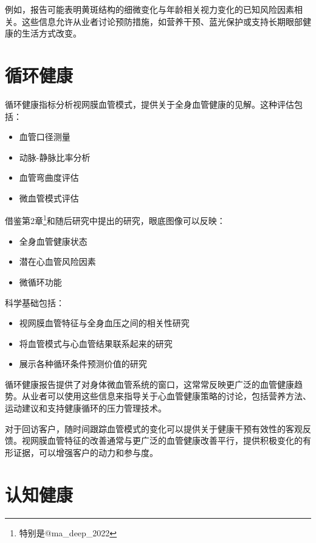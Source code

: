 \documentclass[
  Letterpaper,
]{scrbook}
\providecommand{\tightlist}{%
  \setlength{\itemsep}{0pt}\setlength{\parskip}{0pt}}\usepackage{longtable,booktabs,array}
\begin{document}
例如，报告可能表明黄斑结构的细微变化与年龄相关视力变化的已知风险因素相关。这些信息允许从业者讨论预防措施，如营养干预、蓝光保护或支持长期眼部健康的生活方式改变。

\section{循环健康}\label{ux5faaux73afux5065ux5eb7}

循环健康指标分析视网膜血管模式，提供关于全身血管健康的见解。这种评估包括：

\begin{itemize}
\tightlist
\item
  血管口径测量
\item
  动脉-静脉比率分析
\item
  血管弯曲度评估
\item
  微血管模式评估
\end{itemize}

借鉴第2章\footnote{特别是@ma\_deep\_2022}和随后研究中提出的研究，眼底图像可以反映：

\begin{itemize}
\tightlist
\item
  全身血管健康状态
\item
  潜在心血管风险因素
\item
  微循环功能
\end{itemize}

科学基础包括：

\begin{itemize}
\tightlist
\item
  视网膜血管特征与全身血压之间的相关性研究
\item
  将血管模式与心血管结果联系起来的研究
\item
  展示各种循环条件预测价值的研究
\end{itemize}

循环健康报告提供了对身体微血管系统的窗口，这常常反映更广泛的血管健康趋势。从业者可以使用这些信息来指导关于心血管健康策略的讨论，包括营养方法、运动建议和支持健康循环的压力管理技术。

对于回访客户，随时间跟踪血管模式的变化可以提供关于健康干预有效性的客观反馈。视网膜血管特征的改善通常与更广泛的血管健康改善平行，提供积极变化的有形证据，可以增强客户的动力和参与度。

\section{认知健康}\label{ux8ba4ux77e5ux5065ux5eb7}
\end{document}
